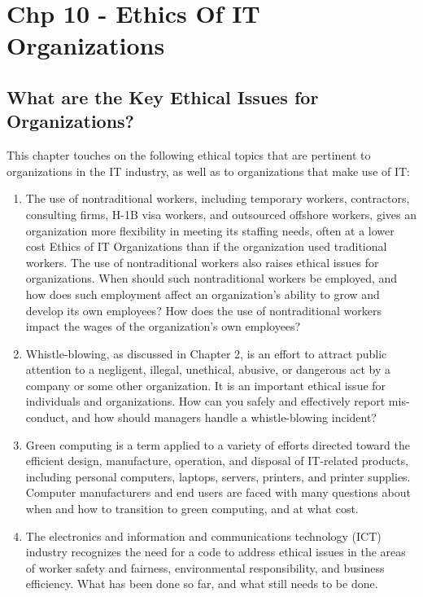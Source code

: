 \documentclass[11pt]{article}
\author{Abhijit Paul}
\date{\today}
\title{}
\begin{document}
\tableofcontents

\section{Chp 10 - Ethics Of IT Organizations}
\label{sec:org800121d}
\subsection{What are the Key Ethical Issues for Organizations?}
\label{sec:org6b680e3}
This chapter touches on the following ethical topics that are pertinent to organizations in the IT industry, as well as to organizations that make use of IT:

\begin{enumerate}
\item The use of nontraditional workers, including temporary workers, contractors, consulting firms, H-1B visa workers, and outsourced offshore workers, gives an organization more flexibility in meeting its staffing needs, often at a lower cost Ethics of IT Organizations than if the organization used traditional workers. The use of nontraditional workers also raises ethical issues for organizations. When should such nontraditional workers be employed, and how does such employment affect an organization’s ability to grow and develop its own employees? How does the use of nontraditional workers impact the wages of the organization’s own employees?
\item Whistle-blowing, as discussed in Chapter 2, is an effort to attract public attention to a negligent, illegal, unethical, abusive, or dangerous act by a company or some other organization. It is an important ethical issue for individuals and organizations. How can you safely and effectively report mis- conduct, and how should managers handle a whistle-blowing incident?
\item Green computing is a term applied to a variety of efforts directed toward the efficient design, manufacture, operation, and disposal of IT-related products, including personal computers, laptops, servers, printers, and printer supplies. Computer manufacturers and end users are faced with many questions about when and how to transition to green computing, and at what cost.
\item The electronics and information and communications technology (ICT) industry recognizes the need for a code to address ethical issues in the areas of worker safety and fairness, environmental responsibility, and business efficiency. What has been done so far, and what still needs to be done.
\end{enumerate}
\end{document}
